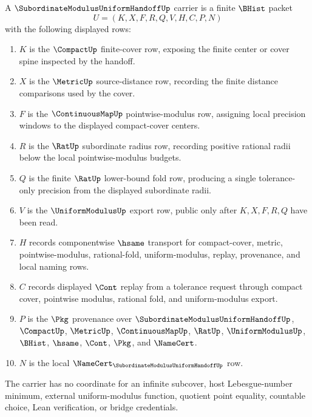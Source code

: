 \begin{definition}
\label{def:subordinate-modulus-uniform-handoff-carrier}
A $\SubordinateModulusUniformHandoffUp$ carrier is a finite $\BHist$ packet
$$
U=(K,X,F,R,Q,V,H,C,P,N)
$$
with the following displayed rows:
\begin{enumerate}
\item $K$ is the $\CompactUp$ finite-cover row, exposing the finite center or cover spine inspected by the handoff.
\item $X$ is the $\MetricUp$ source-distance row, recording the finite distance comparisons used by the cover.
\item $F$ is the $\ContinuousMapUp$ pointwise-modulus row, assigning local precision windows to the displayed compact-cover centers.
\item $R$ is the $\RatUp$ subordinate radius row, recording positive rational radii below the local pointwise-modulus budgets.
\item $Q$ is the finite $\RatUp$ lower-bound fold row, producing a single tolerance-only precision from the displayed subordinate radii.
\item $V$ is the $\UniformModulusUp$ export row, public only after $K,X,F,R,Q$ have been read.
\item $H$ records componentwise $\hsame$ transport for compact-cover, metric, pointwise-modulus, rational-fold, uniform-modulus, replay, provenance, and local naming rows.
\item $C$ records displayed $\Cont$ replay from a tolerance request through compact cover, pointwise modulus, rational fold, and uniform-modulus export.
\item $P$ is the $\Pkg$ provenance over $\SubordinateModulusUniformHandoffUp$, $\CompactUp$, $\MetricUp$, $\ContinuousMapUp$, $\RatUp$, $\UniformModulusUp$, $\BHist$, $\hsame$, $\Cont$, $\Pkg$, and $\NameCert$.
\item $N$ is the local $\NameCert_{\SubordinateModulusUniformHandoffUp}$ row.
\end{enumerate}
The carrier has no coordinate for an infinite subcover, host Lebesgue-number minimum, external uniform-modulus function, quotient point equality, countable choice, Lean verification, or bridge credentials.
\end{definition}

